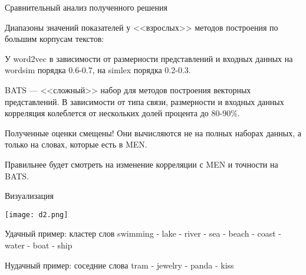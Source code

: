 \documentclass[9pt]{beamer}
\begin{document}
\begin{frame}{Сравнительный анализ полученного решения}
\begin{table}[h]
\begin{center}
\end{center}
\end{table}

Диапазоны значений показателей у <<взрослых>> методов построения по большим корпусам текстов:

У word2vec в зависимости от размерности представлений и входных данных на wordsim порядка 0.6-0.7, на simlex порядка 0.2-0.3.

BATS --- <<сложный>> набор для методов построения векторных представлений. В зависимости от типа связи, размерности и входных данных корреляция колеблется от нескольких долей процента до 80-90\%.

\vspace{\baselineskip}

Полученные оценки смещены! Они вычисляются не на полных наборах данных, а только на словах, которые есть в MEN.

\vspace{\baselineskip}

Правильнее будет смотреть на изменение корреляции с MEN и точности на BATS.


\end{frame}

\begin{frame}{Визуализация}
    \begin{center}
    \texttt{[image: d2.png]}
    \end{center}
    
    Удачный пример: кластер слов swimming - lake - river - sea - beach - coast - water - boat - ship
    
    Нудачный пример: соседние слова tram - jewelry - panda - kiss
\end{frame}
\end{document}
